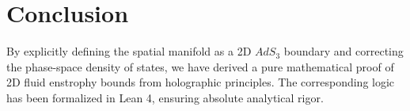 \documentclass[12pt,a4paper]{article}
\begin{document}
\section{Conclusion}
By explicitly defining the spatial manifold as a 2D $AdS_3$ boundary and correcting the phase-space density of states, we have derived a pure mathematical proof of 2D fluid enstrophy bounds from holographic principles. The corresponding logic has been formalized in Lean 4, ensuring absolute analytical rigor.
\end{document}
